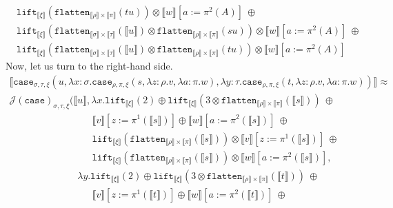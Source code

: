 \documentclass[a4paper,UKenglish,cleveref,autoref,numberwithinsect]{lipics-v2019}
\theoremstyle{definition}
\newcommand{\abs}[2]{\lambda #1.#2}
\newcommand{\flatten}{\mathtt{flatten}}
\newcommand{\lift}{\mathtt{lift}}
\newcommand{\typeinterpret}[1]{\llbracket #1 \rrbracket}
\newcommand{\interpret}[1]{\llbracket #1 \rrbracket}
\begin{document}
\begin{itemize}
\[\begin{array}{l}
  \phantom{A}
    \lift_{\typeinterpret{\xi}}(\flatten_{\typeinterpret{\rho} \times
    \typeinterpret{\pi}}(tu)) \otimes
    \interpret{w}[a:=\pi^2(A)]
    \ \oplus \\
  \phantom{A}
    \lift_{\typeinterpret{\xi}}(\flatten_{\typeinterpret{\sigma} \times
    \typeinterpret{\tau}}(\interpret{u}) \otimes
    \flatten_{\typeinterpret{\rho} \times \typeinterpret{\pi}}(su))
    \otimes
    \interpret{w}[a:=\pi^2(A)]
    \ \oplus \\
  \phantom{A}
    \lift_{\typeinterpret{\xi}}(\flatten_{\typeinterpret{\sigma} \times
    \typeinterpret{\tau}}(\interpret{u}) \otimes
    \flatten_{\typeinterpret{\rho} \times \typeinterpret{\pi}}(tu))
    \otimes
    \interpret{w}[a:=\pi^2(A)]
  \end{array}
  \]
  Now, let us turn to the right-hand side.
  \[
  \begin{array}{l}
  \interpret{\mathtt{case}_{\sigma,\tau,\xi}(u,\abs{x:\sigma}{
  \mathtt{case}_{\rho,\pi,\xi}(s,\abs{z:\rho}{v},\abs{a:\pi}{w})},
  \abs{y:\tau}{\mathtt{case}_{\rho,\pi,\xi}(t,\abs{z:\rho}{v},\abs{a:
  \pi}{w})})} \approx \\
  \mathcal{J}(\mathtt{case})_{\sigma,\tau,\xi}(\interpret{u},\abs{x}{
    \lift_{\typeinterpret{\xi}}(2) \oplus
      \lift_{\typeinterpret{\xi}}(3 \otimes \flatten_{
      \typeinterpret{\rho} \times \typeinterpret{\pi}}(\interpret{s}))\
      \oplus \\
    \phantom{ABCDEFGHIJKL}
      \interpret{v}[z:=\pi^1(\interpret{s})] \oplus
      \interpret{w}[a:=\pi^2(\interpret{s})]\ \oplus \\
    \phantom{ABCDEFGHIJKL}
      \lift_{\typeinterpret{\xi}}(\flatten_{\typeinterpret{\rho} \times
      \typeinterpret{\pi}}(\interpret{s}))
      \otimes \interpret{v}[z:=\pi^1(\interpret{s})]\
      \oplus \\
    \phantom{ABCDEFGHIJKL}
      \lift_{\typeinterpret{\xi}}(\flatten_{\typeinterpret{\rho}
      \times \typeinterpret{\pi}}(\interpret{s}))
      \otimes \interpret{w}[a:=\pi^2(\interpret{s})]
    },\ \\
    \phantom{ABCDEFGHIJ}\abs{y}{
    \lift_{\typeinterpret{\xi}}(2) \oplus
      \lift_{\typeinterpret{\xi}}(3 \otimes \flatten_{
      \typeinterpret{\rho} \times \typeinterpret{\pi}}(\interpret{t}))\
      \oplus \\
    \phantom{ABCDEFGHIJKL}
      \interpret{v}[z:=\pi^1(\interpret{t})] \oplus
      \interpret{w}[a:=\pi^2(\interpret{t})]\ \oplus \\
    \phantom{ABCDEFGHIJKL}
}
\end{array}\]
\end{itemize}
\end{document}
